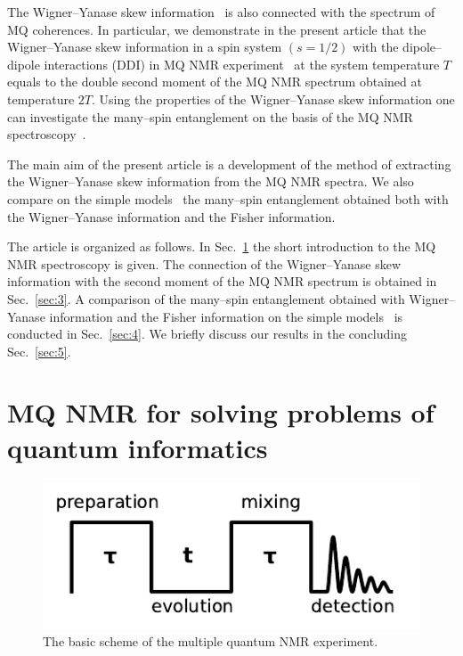 \documentclass[preprint,12pt]{elsarticle}
\begin{document}
The Wigner--Yanase skew information~\cite{1,2,3,4} is also connected with the spectrum of MQ coherences.
In particular, we demonstrate in the present article that the Wigner--Yanase skew information in a spin system $(s = 1/2)$ with the dipole--dipole interactions (DDI) in MQ NMR experiment~\cite{10} at the system temperature $T$ equals to the double second moment of the MQ NMR spectrum obtained at temperature $2T$.
Using the properties of the Wigner--Yanase skew information one can investigate the many--spin entanglement on the basis of the MQ NMR spectroscopy~\cite{10}.


The main aim of the present article is a development of the method of extracting the Wigner--Yanase skew information from the MQ NMR spectra.
We also compare on the simple models~\cite{8,16} the many--spin entanglement obtained both with the Wigner--Yanase information and the Fisher information.


The article is organized as follows.
In Sec.~\ref{sec:2} the short introduction to the MQ NMR spectroscopy is given.
The connection of the Wigner--Yanase skew information with the second moment of the MQ NMR spectrum is obtained in Sec.~\ref{sec:3}.
A comparison of the many--spin entanglement obtained with Wigner--Yanase information and the Fisher information on the simple models~\cite{8,16} is conducted in Sec.~\ref{sec:4}.
We briefly discuss our results in the concluding Sec.~\ref{sec:5}.


\section{MQ NMR for solving problems of quantum informatics}
\label{sec:2}


\begin{figure}
	\includegraphics[width=0.95\linewidth]{mq-experiment}
	\caption{The basic scheme of the multiple quantum NMR experiment.}
	\label{fig:1}
\end{figure}
\end{document}
